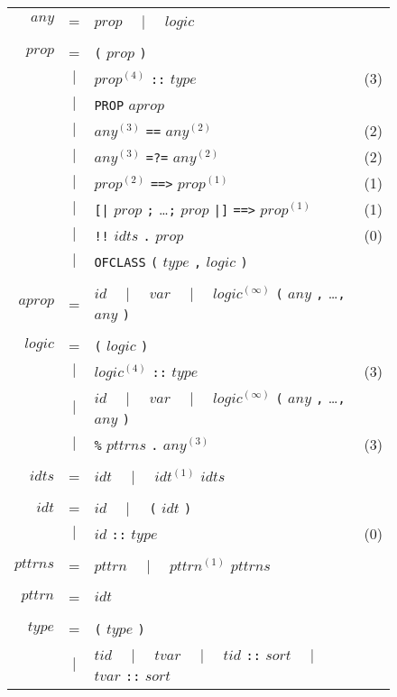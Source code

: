 \begin{figure}
\begin{center}
\begin{tabular}{rclc}
$any$ &=& $prop$ ~~$|$~~ $logic$ \\\\
$prop$ &=& {\tt(} $prop$ {\tt)} \\
     &$|$& $prop^{(4)}$ {\tt::} $type$ & (3) \\
     &$|$& {\tt PROP} $aprop$ \\
     &$|$& $any^{(3)}$ {\tt ==} $any^{(2)}$ & (2) \\
     &$|$& $any^{(3)}$ {\tt =?=} $any^{(2)}$ & (2) \\
     &$|$& $prop^{(2)}$ {\tt ==>} $prop^{(1)}$ & (1) \\
     &$|$& {\tt[|} $prop$ {\tt;} \dots {\tt;} $prop$ {\tt|]} {\tt==>} $prop^{(1)}$ & (1) \\
     &$|$& {\tt!!} $idts$ {\tt.} $prop$ & (0) \\
     &$|$& {\tt OFCLASS} {\tt(} $type$ {\tt,} $logic$ {\tt)} \\\\
$aprop$ &=& $id$ ~~$|$~~ $var$
    ~~$|$~~ $logic^{(\infty)}$ {\tt(} $any$ {\tt,} \dots {\tt,} $any$ {\tt)} \\\\
$logic$ &=& {\tt(} $logic$ {\tt)} \\
      &$|$& $logic^{(4)}$ {\tt::} $type$ & (3) \\
      &$|$& $id$ ~~$|$~~ $var$
    ~~$|$~~ $logic^{(\infty)}$ {\tt(} $any$ {\tt,} \dots {\tt,} $any$ {\tt)} \\
      &$|$& {\tt \%} $pttrns$ {\tt.} $any^{(3)}$ & (3) \\\\
$idts$ &=& $idt$ ~~$|$~~ $idt^{(1)}$ $idts$ \\\\
$idt$ &=& $id$ ~~$|$~~ {\tt(} $idt$ {\tt)} \\
    &$|$& $id$ {\tt ::} $type$ & (0) \\\\
$pttrns$ &=& $pttrn$ ~~$|$~~ $pttrn^{(1)}$ $pttrns$ \\\\
$pttrn$ &=& $idt$ \\\\
$type$ &=& {\tt(} $type$ {\tt)} \\
     &$|$& $tid$ ~~$|$~~ $tvar$ ~~$|$~~ $tid$ {\tt::} $sort$
       ~~$|$~~ $tvar$ {\tt::} $sort$ \\

\end{tabular}
\end{center}
\end{figure}
